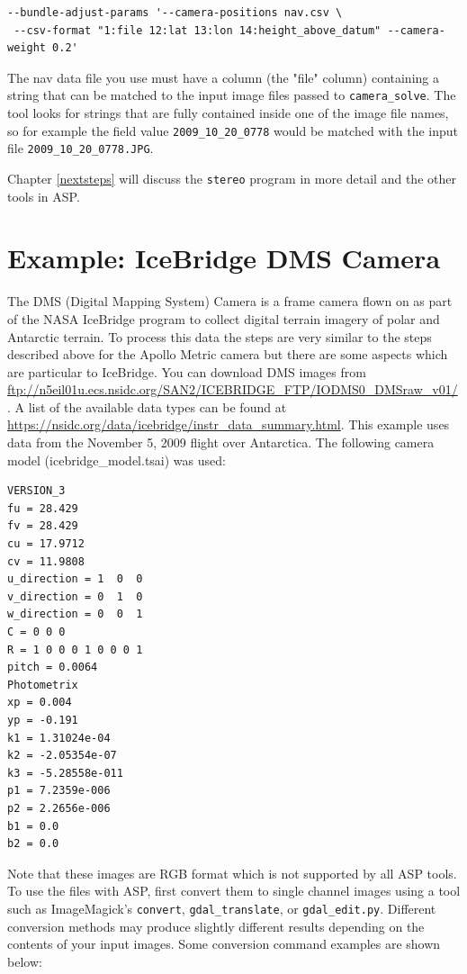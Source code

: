\begin{verbatim}
--bundle-adjust-params '--camera-positions nav.csv \
 --csv-format "1:file 12:lat 13:lon 14:height_above_datum" --camera-weight 0.2'
\end{verbatim}

The nav data file you use must have a column (the "file" column) containing a string that can be matched to the
input image files passed to \texttt{camera\_solve}.  The tool looks for strings that are fully contained
inside one of the image file names, so for example the field value \texttt{2009\_10\_20\_0778} would be
matched with the input file \texttt{2009\_10\_20\_0778.JPG}.

Chapter \ref{nextsteps} will discuss the \texttt{stereo} program in more
detail and the other tools in ASP.

\section{Example: IceBridge DMS Camera}
\label{sfm:icebridge}


The DMS (Digital Mapping System) Camera is a frame camera flown on as part of the NASA
IceBridge program to collect digital terrain imagery of polar and Antarctic terrain.  To process this
data the steps are very similar to the steps described above for the Apollo Metric camera but there
are some aspects which are particular to IceBridge.  You can download DMS images from
\url{ftp://n5eil01u.ecs.nsidc.org/SAN2/ICEBRIDGE_FTP/IODMS0_DMSraw_v01/}.  A list of
the available data types can be found at \url{https://nsidc.org/data/icebridge/instr_data_summary.html}.
This example uses data from the November 5, 2009 flight over Antarctica. 
The following camera model (icebridge\_model.tsai) was used:

\begin{verbatim}
VERSION_3
fu = 28.429
fv = 28.429
cu = 17.9712
cv = 11.9808
u_direction = 1  0  0
v_direction = 0  1  0
w_direction = 0  0  1
C = 0 0 0
R = 1 0 0 0 1 0 0 0 1
pitch = 0.0064
Photometrix
xp = 0.004
yp = -0.191
k1 = 1.31024e-04
k2 = -2.05354e-07
k3 = -5.28558e-011
p1 = 7.2359e-006
p2 = 2.2656e-006
b1 = 0.0
b2 = 0.0
\end{verbatim}

Note that these images are RGB format which is not supported by all ASP tools.  
To use the files with ASP, first convert them to single channel images using 
a tool such as ImageMagick's \texttt{convert}, \texttt{gdal\_translate}, or 
\texttt{gdal\_edit.py}. Different conversion methods may produce slightly different
results depending on the contents of your input images.
Some conversion command examples are shown below:

